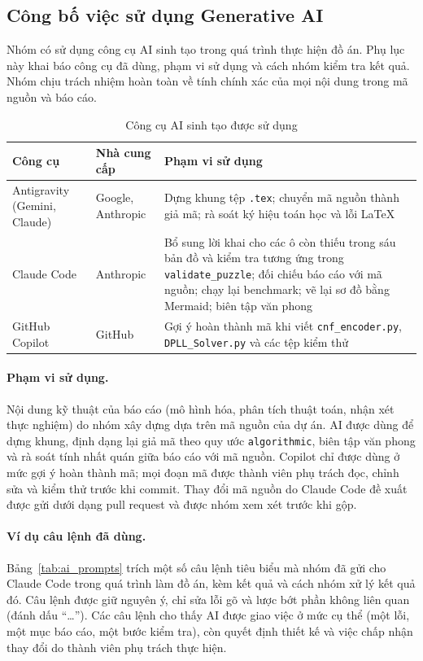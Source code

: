 \subsection{Công bố việc sử dụng Generative AI}
\label{sec:genai_usage}

Nhóm có sử dụng công cụ AI sinh tạo trong quá trình thực hiện đồ án. Phụ lục
này khai báo công cụ đã dùng, phạm vi sử dụng và cách nhóm kiểm tra kết quả.
Nhóm chịu trách nhiệm hoàn toàn về tính chính xác của mọi nội dung trong mã
nguồn và báo cáo.

\begin{table}[htbp]
  \centering\small
  \caption{Công cụ AI sinh tạo được sử dụng}
  \label{tab:ai_tools}
  \begin{tabularx}{\textwidth}{ll>{\raggedright\arraybackslash}X}
    \toprule
    \textbf{Công cụ} & \textbf{Nhà cung cấp} & \textbf{Phạm vi sử dụng} \\
    \midrule
    Antigravity (Gemini, Claude) & Google, Anthropic &
      Dựng khung tệp \texttt{.tex}; chuyển mã nguồn thành giả mã; rà soát ký
      hiệu toán học và lỗi LaTeX \\
    Claude Code & Anthropic &
      Bổ sung lời khai cho các ô còn thiếu trong sáu bản đồ và kiểm tra tương
      ứng trong \texttt{validate\_puzzle}; đối chiếu báo cáo với mã nguồn; chạy
      lại benchmark; vẽ lại sơ đồ bằng Mermaid; biên tập văn phong \\
    GitHub Copilot & GitHub &
      Gợi ý hoàn thành mã khi viết \texttt{cnf\_encoder.py},
      \texttt{DPLL\_Solver.py} và các tệp kiểm thử \\
    \bottomrule
  \end{tabularx}
\end{table}

\paragraph{Phạm vi sử dụng.}
Nội dung kỹ thuật của báo cáo (mô hình hóa, phân tích thuật toán, nhận xét
thực nghiệm) do nhóm xây dựng dựa trên mã nguồn của dự án. AI được dùng để dựng
khung, định dạng lại giả mã theo quy ước \texttt{algorithmic}, biên tập văn
phong và rà soát tính nhất quán giữa báo cáo với mã nguồn. Copilot chỉ được
dùng ở mức gợi ý hoàn thành mã; mọi đoạn mã được thành viên phụ trách đọc,
chỉnh sửa và kiểm thử trước khi commit. Thay đổi mã nguồn do Claude Code đề
xuất được gửi dưới dạng pull request và được nhóm xem xét trước khi gộp.

\paragraph{Ví dụ câu lệnh đã dùng.}
Bảng~\ref{tab:ai_prompts} trích một số câu lệnh tiêu biểu mà nhóm đã gửi cho
Claude Code trong quá trình làm đồ án, kèm kết quả và cách nhóm xử lý kết quả
đó. Câu lệnh được giữ nguyên ý, chỉ sửa lỗi gõ và lược bớt phần không liên
quan (đánh dấu ``\ldots''). Các câu lệnh cho thấy AI được giao việc ở mức cụ
thể (một lỗi, một mục báo cáo, một bước kiểm tra), còn quyết định thiết kế và
việc chấp nhận thay đổi do thành viên phụ trách thực hiện.

